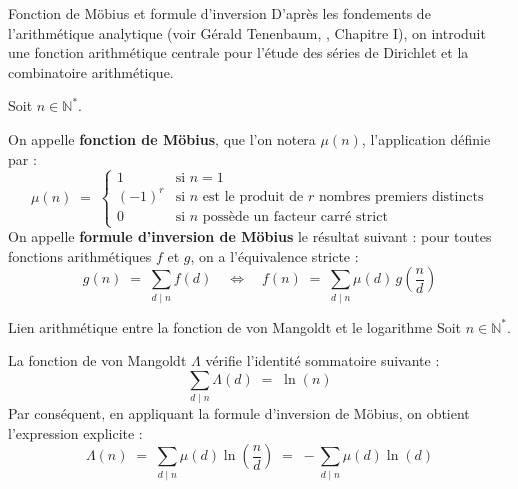 \documentclass[Riemann_Hypothesis.tex]{subfiles}
\begin{document}
\begin{DefNef}[label=df:MobiusInversion_fr]{Fonction de Möbius et formule d'inversion}
    D'après les fondements de l'arithmétique analytique (voir Gérald Tenenbaum, \cite{von-Manglot_tenenbaum2015_intro}, Chapitre I), on introduit une fonction arithmétique centrale pour l'étude des séries de Dirichlet et la combinatoire arithmétique. \par
    Soit $n \in \mathbb{N}^*$. \par
    On appelle \textbf{fonction de Möbius}, que l'on notera $\mu(n)$, l'application définie par :
    \begin{equation*}
        \mu(n) \;=\; 
        \begin{cases}
            1 & \text{si } n = 1 \\ 
            (-1)^r & \text{si } n \text{ est le produit de } r \text{ nombres premiers distincts} \\
            0 & \text{si } n \text{ possède un facteur carré strict}
        \end{cases}
    \end{equation*}
    On appelle \textbf{formule d'inversion de Möbius} le résultat suivant : pour toutes fonctions arithmétiques $f$ et $g$, on a l'équivalence stricte :
    \begin{equation*}
        g(n) \;=\; \sum_{d \mid n} f(d) \quad \iff \quad f(n) \;=\; \sum_{d \mid n} \mu(d) \, g\left(\frac{n}{d}\right)
    \end{equation*}
\end{DefNef}


\begin{proposition}[label=pr:LienMangoldtLog_fr]{Lien arithmétique entre la fonction de von Mangoldt et le logarithme}
    Soit $n \in \mathbb{N}^*$. \par
    La fonction de von Mangoldt $\Lambda$ vérifie l'identité sommatoire suivante :
    \begin{equation*}
        \sum_{d \mid n} \Lambda(d) \;=\; \ln(n)
    \end{equation*}
    Par conséquent, en appliquant la formule d'inversion de Möbius, on obtient l'expression explicite :
    \begin{equation*}
        \Lambda(n) \;=\; \sum_{d \mid n} \mu(d) \ln\left(\frac{n}{d}\right) \;=\; -\sum_{d \mid n} \mu(d) \ln(d)
    \end{equation*}
\end{proposition}
\end{document}

